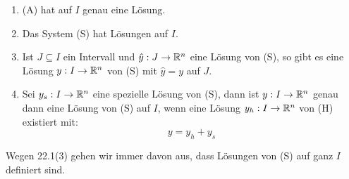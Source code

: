 \documentclass[a4paper,oneside,DIV15,BCOR12mm,chapterprefix=true,headings=onelinechapter]{scrbook}
\begin{document}
\begin{satz}[Lösungen]
\begin{enumerate}
\item (A) hat auf $I$ genau eine Lösung.
\item Das System (S) hat Lösungen auf $I$.
\item Ist $J\subseteq I$ ein Intervall und $\hat y:J\to\mathbb{R}^n$ eine Lösung von (S),
so gibt es eine Lösung $y:I\to\mathbb{R}^n$ von (S) mit $\hat y=y$ auf $J$.
\item Sei $y_s:I\to\mathbb{R}^n$ eine spezielle Lösung von (S), dann ist $y:I\to\mathbb{R}^n$ genau dann eine
Lösung von (S) auf $I$, wenn eine Lösung $y_h:I\to\mathbb{R}^n$ von (H) existiert mit:
\[y=y_h+y_s\]
\end{enumerate}
\end{satz}

\begin{wichtigebemerkung}
Wegen 22.1(3) gehen wir immer davon aus, dass Lösungen von (S) auf ganz $I$ definiert sind.
\end{wichtigebemerkung}
\end{document}
